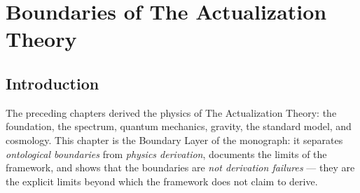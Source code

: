 %
%


\chapter{Boundaries of The Actualization Theory}
\label{c13:chap:boundaries}

\section{Introduction}
\label{c13:sec:boundaries-introduction}

The preceding chapters derived the physics of The Actualization Theory: the foundation, the
spectrum, quantum mechanics, gravity, the standard model, and cosmology. This chapter is the
Boundary Layer of the monograph: it separates \emph{ontological boundaries} from \emph{physics
derivation}, documents the limits of the framework, and shows that the boundaries are
\emph{not derivation failures} --- they are the explicit limits beyond which the framework
does not claim to derive.

